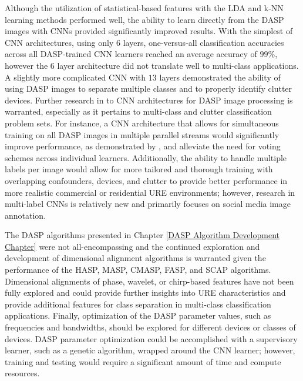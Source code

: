Although the utilization of statistical-based features with the LDA and k-NN learning methods performed well, the ability to learn directly from the DASP images with CNNs provided significantly improved results.  With the simplest of CNN architectures, using only $6$ layers, one-versus-all classification accuracies across all DASP-trained CNN learners reached an average accuracy of $99\%$, however the $6$ layer architecture did not translate well to multi-class applications.  A slightly more complicated CNN with $13$ layers demonstrated the ability of using DASP images to separate multiple classes and to properly identify clutter devices.  Further research in to CNN architectures for DASP image processing is warranted, especially as it pertains to multi-class and clutter classification problem sets.  For instance, a CNN architecture that allows for simultaneous training on all DASP images in multiple parallel streams would significantly improve performance, as demonstrated by \cite{Ciregan2012, Li2015}, and alleviate the need for voting schemes across individual learners.  Additionally, the ability to handle multiple labels per image would allow for more tailored and thorough training with overlapping confounders, devices, and clutter to provide better performance in more realistic commercial or residential URE environments; however, research in multi-label CNNs is relatively new \cite{Wei2016, Wu2015, Gong2013} and primarily focuses on social media image annotation.  

The DASP algorithms presented in Chapter \ref{DASP Algorithm Development Chapter} were not all-encompassing and the continued exploration and development of dimensional alignment algorithms is warranted given the performance of the HASP, MASP, CMASP, FASP, and SCAP algorithms.  Dimensional alignments of phase, wavelet, or chirp-based features have not been fully explored and could provide further insights into URE characteristics and provide additional features for class separation in multi-class classification applications.  Finally, optimization of the DASP parameter values, such as frequencies and bandwidths, should be explored for different devices or classes of devices.  DASP parameter optimization could be accomplished with a supervisory learner, such as a genetic algorithm, wrapped around the CNN learner; however, training and testing would require a significant amount of time and compute resources.


